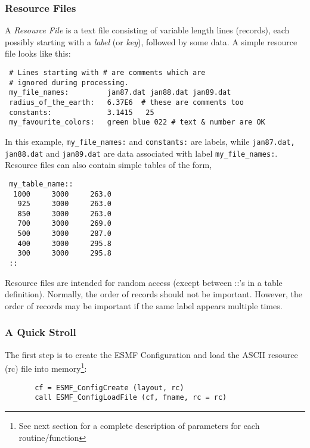 
 \subsubsection{Resource Files}

      A {\em Resource File} is a text file consisting of variable
     length lines (records), each possibly starting with a {\em label}
     (or {\em key}), followed by some data. A simple resource file 
     looks like this:

 \begin{verbatim}
 # Lines starting with # are comments which are
 # ignored during processing.
 my_file_names:         jan87.dat jan88.dat jan89.dat
 radius_of_the_earth:   6.37E6  # these are comments too
 constants:             3.1415   25
 my_favourite_colors:   green blue 022 # text & number are OK
 \end{verbatim}

    In this example, {\tt my\_file\_names:} and {\tt constants:}
    are labels, while {\tt jan87.dat, jan88.dat} and {\tt jan89.dat} are
    data associated with label {\tt my\_file\_names:}.
    Resource files can also contain simple tables of the form,

 \begin{verbatim}
 my_table_name::
  1000     3000     263.0   
   925     3000     263.0
   850     3000     263.0
   700     3000     269.0
   500     3000     287.0
   400     3000     295.8
   300     3000     295.8    
 ::
 \end{verbatim}

 Resource files are intended for random access (except between ::'s in a 
 table definition). Normally, the order of records should not be important. 
 However, the order of records may be important if the same label appears 
 multiple times.

    \subsubsection{A Quick Stroll}

    The first step is to create the ESMF Configuration and load the 
    ASCII resource (rc) file into memory\footnote{See next section 
    for a complete description of parameters for each routine/function}:

 \begin{verbatim}
       cf = ESMF_ConfigCreate (layout, rc)
       call ESMF_ConfigLoadFile (cf, fname, rc = rc)
 \end{verbatim}

